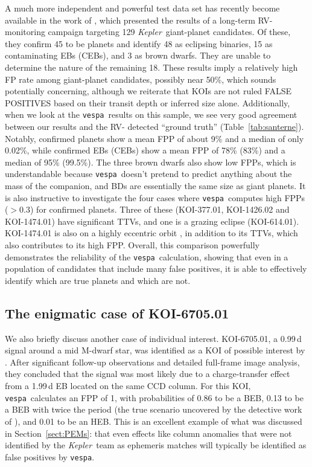\documentclass{emulateapj}
\newcommand{\Tab}[1]{Table~\ref{tab:#1}}
\newcommand{\sectionname}{Section}
\newcommand{\Sect}[1]{\sectionname~\ref{sect:#1}}
\newcommand{\sect}[1]{\Sect{#1}}
\newcommand{\sectlabel}[1]{\label{sect:#1}}
\newcommand{\kepler}{\textit{Kepler}}
\newcommand{\vespa}{\texttt{vespa}}
\begin{document}
A much more independent and powerful test data set has recently become
available in the work of \citet{Santerne:2015}, which presented the
results of a long-term RV-monitoring campaign targeting 129 \kepler\
giant-planet candidates.  Of these, they confirm 45 to be planets and
identify 48 as eclipsing binaries, 15 as contaminating EBs (CEBs), and
3 as brown dwarfs.  They are unable to determine the nature of the
remaining 18.  These results imply a relatively high FP rate among
giant-planet candidates, possibly near 50\%, which sounds potentially
concerning, although we reiterate that KOIs are not ruled FALSE 
POSITIVES based on their transit depth or inferred size alone.
Additionally, when we look at the \vespa\ results on this sample, we
see very good agreement between our results and the RV-
detected ``ground truth'' (\Tab{santerne}).  Notably, confirmed
planets show a mean FPP of about 9\% and a median of only 0.02\%,
while confirmed EBs (CEBs) show a mean FPP of 78\% (83\%) and a median
of 95\% (99.5\%).  The three brown dwarfs also show low FPPs, which is
understandable because \vespa\ doesn't pretend to predict anything
about the mass of the companion, and BDs are essentially the same size
as giant planets.  It is also instructive to investigate the four
cases where \vespa\ computes high FPPs ($>$0.3) for confirmed planets.
Three of these (KOI-377.01, KOI-1426.02 and KOI-1474.01) have
significant TTVs, and one is a grazing eclipse (KOI-614.01).
KOI-1474.01 is also on a highly eccentric orbit \citep{Dawson:2012},
in addition to its TTVs, which also contributes to its high FPP.
Overall, this comparison powerfully demonstrates the reliability of
the \vespa\ calculation, showing that even in a population of
candidates that include many false positives, it is able to
effectively identify which are true planets and which are not.

\subsection{The enigmatic case of KOI-6705.01}
\sectlabel{gaidos}

We also briefly discuss another case of individual interest.
KOI-6705.01, a 0.99\,d signal around a mid M-dwarf star, was
identified  as a KOI of possible interest by \citet{Gaidos:2015}.
After significant follow-up observations and detailed full-frame image
analysis, they concluded that the signal was most likely due to a
charge-transfer  effect from a 1.99\,d EB located on the same CCD
column.  For this KOI, \vespa\ calculates an FPP of 1, with
probabilities of 0.86 to be a BEB, 0.13 to be a BEB with twice the
period (the true scenario uncovered by the detective work of
\citet{Gaidos:2015}), and 0.01 to be an HEB.  This is an excellent
example of what was discussed in \sect{PEMs}: that even effects like
column anomalies that were not identified by the \kepler\ team as
ephemeris matches will typically be identified as false positives by 
\vespa.
\end{document}
